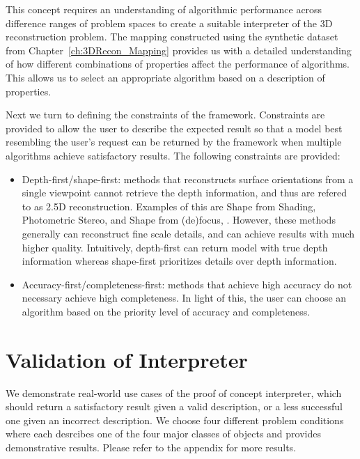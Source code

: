 This concept requires an understanding of algorithmic performance across difference ranges of problem spaces to create a suitable interpreter of the 3D reconstruction problem. The mapping constructed using the synthetic dataset from Chapter~\ref{ch:3DRecon_Mapping} provides us with a detailed understanding of how different combinations of properties affect the performance of algorithms. This allows us to select an appropriate algorithm based on a description of properties.

Next we turn to defining the constraints of the framework. Constraints are provided to allow the user to describe the expected result so that a model best resembling the user's request can be returned by the framework when multiple algorithms achieve satisfactory results. The following constraints are provided: 
\begin{itemize}
\item Depth-first/shape-first: methods that reconstructs surface orientations from a single viewpoint cannot retrieve the depth information, and thus are refered to as 2.5D reconstruction. Examples of this are Shape from Shading, Photometric Stereo, and Shape from (de)focus, \etc. However, these methods generally can reconstruct fine scale details, and can achieve results with much higher quality. Intuitively, depth-first can return model with true depth information whereas shape-first prioritizes details over depth information.
\item Accuracy-first/completeness-first: methods that achieve high accuracy do not necessary achieve high completeness. In light of this, the user can choose an algorithm based on the priority level of accuracy and completeness.
\end{itemize}

\section{Validation of Interpreter}
\label{sec:interp_useful}
We demonstrate real-world use cases of the proof of concept interpreter, which should return a satisfactory result given a valid description, or a less successful one given an incorrect description. We choose four different problem conditions where each desrcibes one of the four major classes of objects and provides demonstrative results. Please refer to the appendix for more results.

